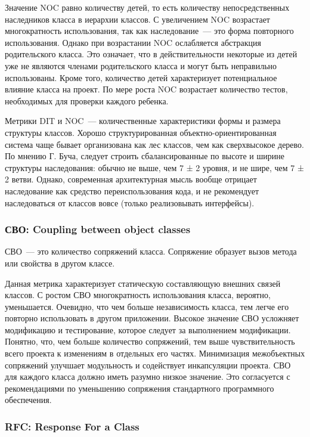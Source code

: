 \documentclass{../../text-style}
\begin{document}
Значение NOC равно количеству детей, то есть количеству непосредственных наследников класса в иерархии классов. С увеличением NOC возрастает многократность использования, так как наследование~--- это форма повторного использования. Однако при возрастании NOC ослабляется абстракция родительского класса. Это означает, что в действительности некоторые из детей уже не являются членами родительского класса и могут быть неправильно использованы. Кроме того, количество детей характеризует потенциальное влияние класса на проект. По мере роста NOC возрастает количество тестов, необходимых для проверки каждого ребенка.

Метрики DIT и NOC~--- количественные характеристики формы и размера структуры классов. Хорошо структурированная объектно-ориентированная система чаще бывает организована как лес классов, чем как сверхвысокое дерево. По мнению Г. Буча, следует строить сбалансированные по высоте и ширине структуры наследования: обычно не выше, чем 7 ± 2 уровня, и не шире, чем 7 ± 2 ветви. Однако, современная архитектурная мысль вообще отрицает наследование как средство переиспользования кода, и не рекомендует наследоваться от классов вовсе (только реализовывать интерфейсы).

\subsubsection{СВО: Coupling between object classes}

СВО~--- это количество сопряжений класса. Сопряжение образует вызов метода или свойства в другом классе.

Данная метрика характеризует статическую составляющую внешних связей классов. С ростом СВО многократность использования класса, вероятно, уменьшается. Очевидно, что чем больше независимость класса, тем легче его повторно использовать в другом приложении. Высокое значение СВО усложняет модификацию и тестирование, которое следует за выполнением модификации. Понятно, что, чем больше количество сопряжений, тем выше чувствительность всего проекта к изменениям в отдельных его частях. Минимизация межобъектных сопряжений улучшает модульность и содействует инкапсуляции проекта.
СВО для каждого класса должно иметь разумно низкое значение. Это согласуется с рекомендациями по уменьшению сопряжения стандартного программного обеспечения.

\subsubsection{RFC: Response For a Class}
\end{document}
